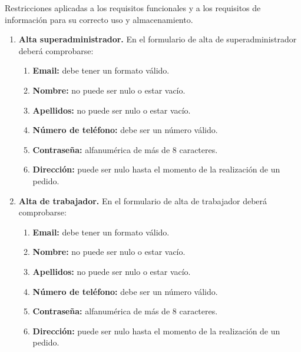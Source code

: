 Restricciones aplicadas a los requisitos funcionales y a los requisitos de información
para su correcto uso y almacenamiento.

\begin{enumerate}[leftmargin=1.75cm,start=1,label={\bfseries RS-\arabic*.}]
\setlength\itemsep{1em} %

    \item \textbf{Alta superadministrador.} En el formulario de alta de superadministrador deberá comprobarse:
    \begin{enumerate}[start=1,label={\bfseries RS-1.\arabic*.}]
        \item \textbf{Email:} debe tener un formato válido.
        \item \textbf{Nombre:} no puede ser nulo o estar vacío.
        \item \textbf{Apellidos:} no puede ser nulo o estar vacío.
        \item \textbf{Número de teléfono:} debe ser un número válido.
        \item \textbf{Contraseña:} alfanumérica de más de 8 caracteres.
        \item \textbf{Dirección:} puede ser nulo hasta el momento de la realización de un pedido.
    \end{enumerate}

    \item \textbf{Alta de trabajador.} En el formulario de alta de trabajador deberá comprobarse:
    \begin{enumerate}[start=1,label={\bfseries RS-2.\arabic*.}]
        \item \textbf{Email:} debe tener un formato válido.
        \item \textbf{Nombre:} no puede ser nulo o estar vacío.
        \item \textbf{Apellidos:} no puede ser nulo o estar vacío.
        \item \textbf{Número de teléfono:} debe ser un número válido.
        \item \textbf{Contraseña:} alfanumérica de más de 8 caracteres.
        \item \textbf{Dirección:} puede ser nulo hasta el momento de la realización de un pedido.
    \end{enumerate}


\end{enumerate}
